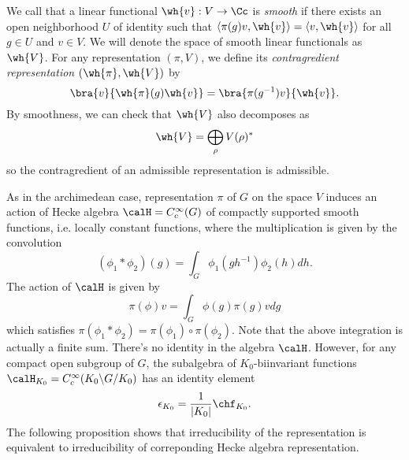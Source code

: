 We call that a linear functional $\wh{v}:V\to \Cc$ is \emph{smooth} if there exists an open neighborhood $U$ of identity such that $\langle \pi(g)v, \wh{v}\rangle = \langle v, \wh{v}\rangle$ for all $g\in U$ and $v\in V$. 
We will denote the space of smooth linear functionals as $\wh{V}$. For any representation $(\pi, V)$, we define its \emph{contragredient representation} $(\wh{\pi}, \wh{V})$ by 
$$
\bra{v}{\wh{\pi}(g)\wh{v}} = \bra{\pi(g^{-1})v}{\wh{v}}.
$$
By smoothness, we can check that $\wh{V}$ also decomposes as
$$
\wh{V} = \bigoplus_{\rho} V(\rho)^{*}
$$
so the contragredient of an admissible representation is admissible. 

As in the archimedean case, representation $\pi$ of $G$ on the space $V$ induces an action of Hecke algebra $\calH = C_{c}^{\infty}(G)$ of compactly supported smooth functions, i.e. locally constant functions, where the multiplication is given by the convolution 
$$
(\phi_{1} * \phi_{2})(g) = \int_{G} \phi_{1}(gh^{-1})\phi_{2}(h) dh.
$$
The action of $\calH$ is given by 
$$
\pi(\phi)v = \int_{G} \phi(g)\pi(g)vdg
$$
which satisfies $\pi(\phi_{1}*\phi_{2}) = \pi(\phi_{1})\circ \pi(\phi_{2})$. Note that the above integration is actually a finite sum. 
There's no identity in the algebra $\calH$. However, for any compact open subgroup of $G$, the subalgebra of $K_{0}$-biinvariant functions $\calH_{K_{0}} = C_{c}^{\infty}(K_{0}\backslash G/K_{0})$ has an identity element 
$$
\epsilon_{K_{0}} = \frac{1}{|K_{0}|} \chf_{K_{0}}. 
$$
The following proposition shows that irreducibility of the representation is equivalent to irreducibility of correponding Hecke algebra representation. 


